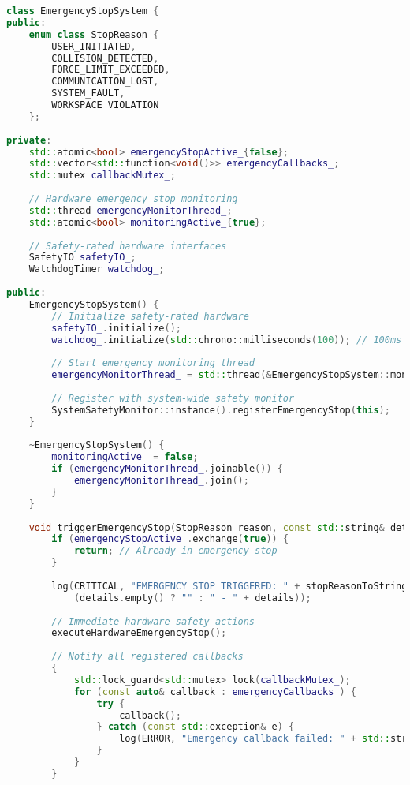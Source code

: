 \begin{lstlisting}[language=C++, caption=Emergency Stop Implementation]
class EmergencyStopSystem {
public:
    enum class StopReason {
        USER_INITIATED,
        COLLISION_DETECTED,
        FORCE_LIMIT_EXCEEDED,
        COMMUNICATION_LOST,
        SYSTEM_FAULT,
        WORKSPACE_VIOLATION
    };
    
private:
    std::atomic<bool> emergencyStopActive_{false};
    std::vector<std::function<void()>> emergencyCallbacks_;
    std::mutex callbackMutex_;
    
    // Hardware emergency stop monitoring
    std::thread emergencyMonitorThread_;
    std::atomic<bool> monitoringActive_{true};
    
    // Safety-rated hardware interfaces
    SafetyIO safetyIO_;
    WatchdogTimer watchdog_;
    
public:
    EmergencyStopSystem() {
        // Initialize safety-rated hardware
        safetyIO_.initialize();
        watchdog_.initialize(std::chrono::milliseconds(100)); // 100ms watchdog
        
        // Start emergency monitoring thread
        emergencyMonitorThread_ = std::thread(&EmergencyStopSystem::monitorEmergencyInputs, this);
        
        // Register with system-wide safety monitor
        SystemSafetyMonitor::instance().registerEmergencyStop(this);
    }
    
    ~EmergencyStopSystem() {
        monitoringActive_ = false;
        if (emergencyMonitorThread_.joinable()) {
            emergencyMonitorThread_.join();
        }
    }
    
    void triggerEmergencyStop(StopReason reason, const std::string& details = "") {
        if (emergencyStopActive_.exchange(true)) {
            return; // Already in emergency stop
        }
        
        log(CRITICAL, "EMERGENCY STOP TRIGGERED: " + stopReasonToString(reason) + 
            (details.empty() ? "" : " - " + details));
        
        // Immediate hardware safety actions
        executeHardwareEmergencyStop();
        
        // Notify all registered callbacks
        {
            std::lock_guard<std::mutex> lock(callbackMutex_);
            for (const auto& callback : emergencyCallbacks_) {
                try {
                    callback();
                } catch (const std::exception& e) {
                    log(ERROR, "Emergency callback failed: " + std::string(e.what()));
                }
            }
        }
        

\end{lstlisting}
